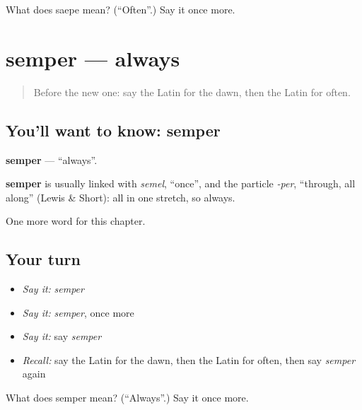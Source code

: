 \begin{tcolorbox}[breakable,colback=teal!4,colframe=teal!35!black,title={Before you move on}]
What does saepe mean? (\textquotedblleft{}Often\textquotedblright{}.) Say it once more.
\end{tcolorbox}
\section[semper]{semper — always}

\label{lesson:LA-C104-semper}



\begin{quote}
Before the new one: say the Latin for the dawn, then the Latin for often.
\end{quote}

\subsection*{You'll want to know: semper}
\textbf{semper} — \textquotedblleft{}always\textquotedblright{}.

\begin{cousinweb}
\textbf{semper} is usually linked with \emph{semel}, \textquotedblleft{}once\textquotedblright{}, and the particle \emph{-per}, \textquotedblleft{}through, all along\textquotedblright{} (Lewis \& Short): all in one stretch, so always.
\end{cousinweb}

\begin{grammarlens}[title={What you've built}]
One more word for this chapter.
\end{grammarlens}

\subsection*{Your turn}
\begin{itemize}
\raggedright
  \item \emph{Say it:} \emph{semper}
  \item \emph{Say it:} \emph{semper}, once more
  \item \emph{Say it:} say \emph{semper}
  \item \emph{Recall:} say the Latin for the dawn, then the Latin for often, then say \emph{semper} again
\end{itemize}

\begin{tcolorbox}[breakable,colback=teal!4,colframe=teal!35!black,title={Before you move on}]
What does semper mean? (\textquotedblleft{}Always\textquotedblright{}.) Say it once more.
\end{tcolorbox}
